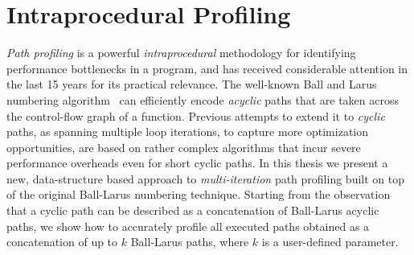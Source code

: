 \section{Intraprocedural Profiling}

{\em Path profiling} is a powerful {\em intraprocedural} methodology for identifying performance bottlenecks in a program, and has received considerable attention in the last 15 years for its practical relevance. The well-known Ball and Larus numbering algorithm~\cite{Ball96} can efficiently encode {\em acyclic} paths that are taken across the control-flow graph of a function. Previous attempts to extend it to {\em cyclic} paths, as spanning multiple loop iterations, to capture more optimization opportunities, are based on rather complex algorithms that incur severe performance overheads even for short cyclic paths. In this thesis we present a new, data-structure based approach to {\em multi-iteration} path profiling built on top of the original Ball-Larus numbering technique. Starting from the observation that a cyclic path can be described as a concatenation of Ball-Larus acyclic paths, we show how to accurately profile all executed paths obtained as a concatenation of up to $k$ Ball-Larus paths, where $k$ is a user-defined parameter.



